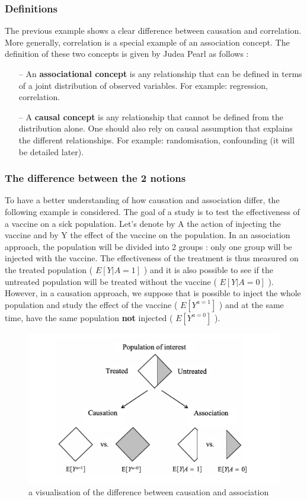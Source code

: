 \documentclass{article}
\begin{document}
	\subsubsection{Definitions}
	
The previous example shows a clear difference between causation and correlation. More generally, correlation is a special example of an association concept. The definition of these two concepts is given by Judea Pearl\cite{pearl2010mathematics, pearl2009causal} as follows :

\begin{itemize}
\item[--] An \textbf{associational concept} is any relationship that can be defined in terms of a joint distribution of observed variables. For example: regression, correlation.
\item[--] A \textbf{causal concept} is any relationship that cannot be defined from the distribution alone. One should also rely on causal assumption that explains the different relationships. For example: randomisation, confounding (it will be detailed later).
\end{itemize}


	\subsubsection{The difference between the 2 notions}

To have a better understanding of how causation and association differ, the following example is considered. The goal of a study is to test the effectiveness of a vaccine on a sick population. Let's denote by A the action of injecting the vaccine and by Y the effect of the vaccine on the population. In an association approach, the population will be divided into 2 groups : only one group will be injected with the vaccine. The effectiveness of the treatment is thus measured on the treated population ( $E[Y|A = 1]$ ) and it is also possible to see if the untreated population will be treated without the vaccine ( $E[Y|A = 0]$ ). However, in a causation approach, we suppose that is possible to inject the whole population and study the effect of the vaccine ( $E[Y^{a=1}]$ ) and at the same time, have the same population \textbf{not} injected ( $E[Y^{a=0}]$ ).

\begin{figure}[h]
\centering
\includegraphics[width=0.6 \textwidth]{../figures/asso_caus.png}
\caption{a visualisation of the difference between causation and association}
\end{figure}
\end{document}
